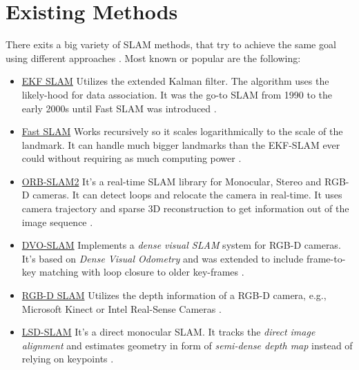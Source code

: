 \section{Existing Methods}
There exits a big variety of SLAM methods, that try to achieve the same goal using different approaches \cite{openslam}.
Most known or popular are the following:
\begin{itemize}
    \item \underline{EKF SLAM} \newline
    Utilizes the extended Kalman filter. The algorithm  uses the likely-hood for data association.
    It was the go-to SLAM from 1990 to the early 2000s until Fast SLAM was introduced \cite{Fastslam}. 
    
    \item \underline{Fast SLAM} \newline
    Works recursively  so it scales logarithmically to the scale of the landmark. It can handle much bigger landmarks than the EKF-SLAM ever could without requiring as much computing power \cite{Fastslam}. 
    
    \item \underline{ORB-SLAM2} \newline
    It's a real-time SLAM library for Monocular, Stereo and RGB-D cameras. It can detect loops and relocate the camera in real-time. It uses camera trajectory and sparse 3D reconstruction to get information out of the image sequence \cite{orbslam}.
    
    \item \underline{DVO-SLAM} \newline
    Implements a \textit{dense visual SLAM} system for RGB-D cameras. It's based on \textit{Dense Visual Odometry} and was extended to include frame-to-key matching with loop closure to older key-frames \cite{dvoslam1}. 
    
    \item \underline{RGB-D SLAM} \newline
    Utilizes the depth information of a RGB-D camera, e.g., Microsoft Kinect or Intel Real-Sense Cameras \cite{rosrgbdslam}.
    
    \item \underline{LSD-SLAM} \newline
    It's a direct monocular SLAM. It tracks the \textit{direct image alignment} and estimates geometry in form of \textit{semi-dense depth map} instead of relying on keypoints \cite{lsdslam_eccv}.
\end{itemize}